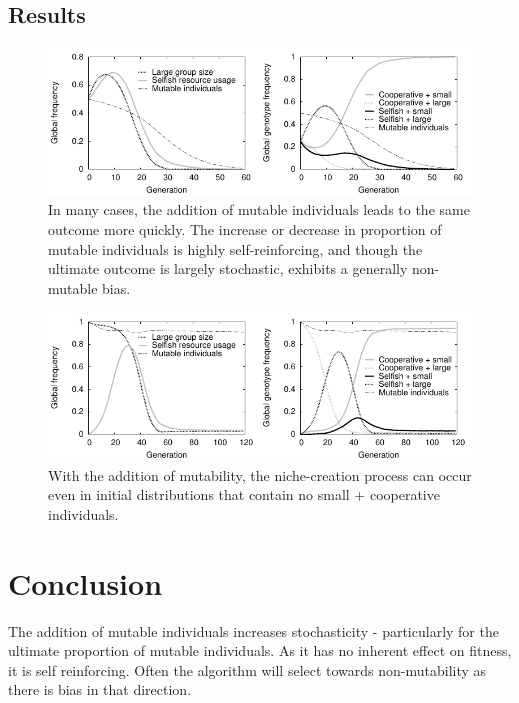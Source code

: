 \documentclass[11pt]{article}
\begin{document}
\subsection{Results}
\begin{figure}[!ht]
  \centering
  \includegraphics{60geneqmutfix.pdf}
  \caption{In many cases, the addition of mutable individuals leads to the same outcome more quickly. The increase or decrease in proportion of mutable individuals is highly self-reinforcing, and though the ultimate outcome is largely stochastic, exhibits a generally non-mutable bias.}
  \label{fig:60geneqmutfix}
\end{figure}

\begin{figure}[!ht]
  \centering
  \includegraphics{120geninteresting.pdf}
  \caption{With the addition of mutability, the niche-creation process can occur even in initial distributions that contain no small + cooperative individuals.}
  \label{fig:120geninteresting}
\end{figure}

\section{Conclusion}
The addition of mutable individuals increases stochasticity - particularly for the ultimate proportion of mutable individuals. As it has no inherent effect on fitness, it is self reinforcing. Often the algorithm will select towards non-mutability as there is bias in that direction.
\end{document}
